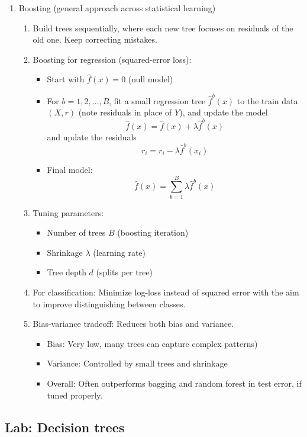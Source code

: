 \documentclass{article}
\begin{document}
\begin{enumerate}
\item Boosting (general approach across statistical learning)
\begin{enumerate}
\item Build trees sequentially, where each new tree focuses on residuals of the old one. Keep correcting mistakes.
\item Boosting for regression (squared-error loss):
\begin{itemize}
\item Start with $\hat{f}(x) = 0$ (null model)
\item For $b=1,2,\dots,B$, fit a small regression tree $\hat{f}^b(x)$ to the train data $(X,r)$ (note residuals in place of $Y$), and update the model
\[
\hat{f}(x) = \hat{f}(x)+\lambda \hat{f}^b(x)
\]
and update the residuals
\[
r_i = r_i - \lambda \hat{f}^b(x_i)
\]
\item Final model:
\[
\hat{f}(x) = \sum_{b=1}^B \lambda \hat{f}^b(x)
\]
\end{itemize}
\item Tuning parameters:
\begin{itemize}
\item Number of trees $B$ (boosting iteration)
\item Shrinkage $\lambda$ (learning rate)
\item Tree depth $d$ (splits per tree)
\end{itemize}

\item For classification: Minimize log-loss instead of squared error with the aim to improve distinguishing between classes.
\item Bias-variance tradeoff: Reduces both bias and variance.
\begin{itemize}
\item Bias: Very low, many trees can capture complex patterns)
\item Variance: Controlled by small trees and shrinkage
\item Overall: Often outperforms bagging and random forest in test error, if tuned properly.
\end{itemize}
\end{enumerate}
\end{enumerate}

\subsection*{Lab: Decision trees}
\end{document}
